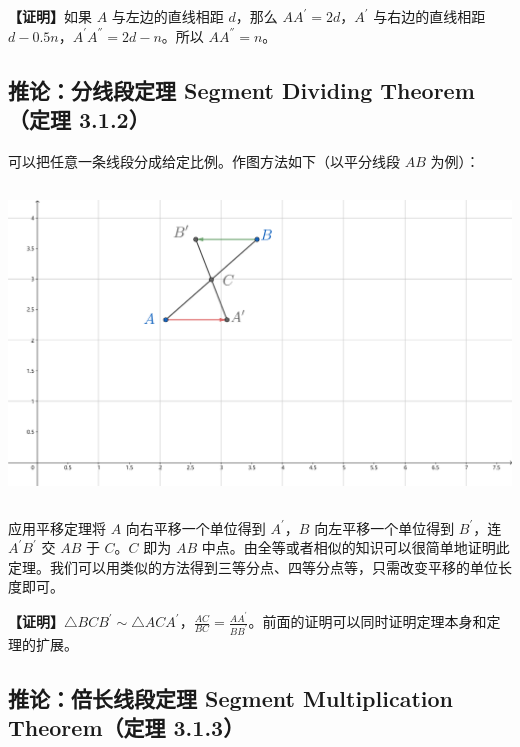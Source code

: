 \documentclass[UTF8]{article}
\begin{document}
\textbf{【证明】}如果 \(A\) 与左边的直线相距 \(d\)，那么
\(AA^{'} = 2d\)，\(A^{'}\) 与右边的直线相距
\(d - 0.5n\)，\(A^{'}A^{''} = 2d - n\)。所以 \(AA^{''} = n\)。

\hypertarget{ux63a8ux8bbaux5206ux7ebfux6bb5ux5b9aux7406-segment-dividing-theoremux5b9aux7406-3.1.2}{%
\subsection{推论：分线段定理 Segment Dividing Theorem（定理
3.1.2）}\label{ux63a8ux8bbaux5206ux7ebfux6bb5ux5b9aux7406-segment-dividing-theoremux5b9aux7406-3.1.2}}

可以把任意一条线段分成给定比例。作图方法如下（以平分线段 \(AB\) 为例）：

\includegraphics[width=5.76806in,height=3.27847in]{media/image6.png}

应用平移定理将 \(A\) 向右平移一个单位得到 \(A^{'}\)，\(B\)
向左平移一个单位得到 \(B^{'}\)，连 \(A^{'}B^{'}\) 交 \(AB\) 于
\(C\)。\(C\) 即为 \(AB\)
中点。由全等或者相似的知识可以很简单地证明此定理。我们可以用类似的方法得到三等分点、四等分点等，只需改变平移的单位长度即可。

\textbf{【证明】}\(\bigtriangleup BCB^{'} \sim \bigtriangleup ACA^{'}\)，\(\frac{AC}{BC} = \frac{AA^{'}}{BB^{'}}\)。前面的证明可以同时证明定理本身和定理的扩展。

\hypertarget{ux63a8ux8bbaux500dux957fux7ebfux6bb5ux5b9aux7406-segment-multiplication-theoremux5b9aux7406-3.1.3}{%
\subsection{推论：倍长线段定理 Segment Multiplication Theorem（定理
3.1.3）}\label{ux63a8ux8bbaux500dux957fux7ebfux6bb5ux5b9aux7406-segment-multiplication-theoremux5b9aux7406-3.1.3}}
\end{document}
